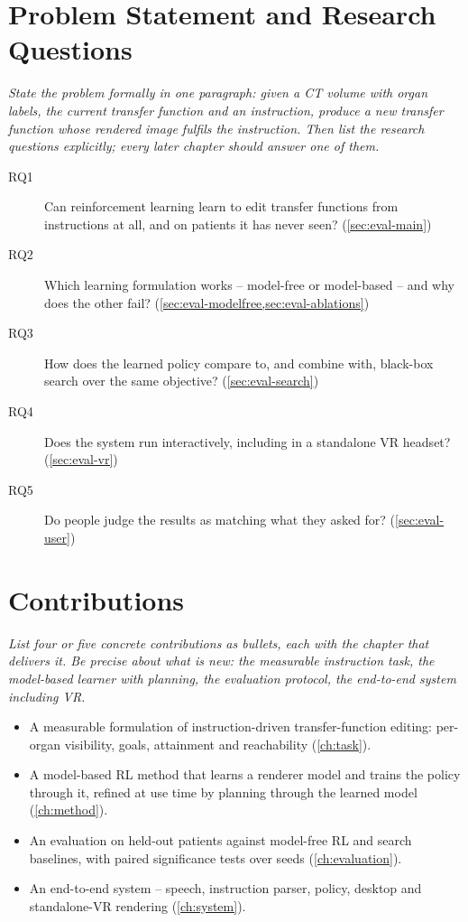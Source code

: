 \documentclass[12pt, a4paper]{book}
\newcommand{\plan}[1]{{\color{gray}\itshape #1\par}}
\begin{document}
\section{Problem Statement and Research Questions}
\label{sec:intro-questions}
\plan{State the problem formally in one paragraph: given a CT volume with organ labels, the current transfer function and an instruction, produce a new transfer function whose rendered image fulfils the instruction. Then list the research questions explicitly; every later chapter should answer one of them.}

\begin{description}
  \item[RQ1] Can reinforcement learning learn to edit transfer functions from instructions at all, and on patients it has never seen? \hfill (\cref{sec:eval-main})
  \item[RQ2] Which learning formulation works -- model-free or model-based -- and why does the other fail? \hfill (\cref{sec:eval-modelfree,sec:eval-ablations})
  \item[RQ3] How does the learned policy compare to, and combine with, black-box search over the same objective? \hfill (\cref{sec:eval-search})
  \item[RQ4] Does the system run interactively, including in a standalone VR headset? \hfill (\cref{sec:eval-vr})
  \item[RQ5] Do people judge the results as matching what they asked for? \hfill (\cref{sec:eval-user})
\end{description}

\section{Contributions}
\label{sec:intro-contributions}
\plan{List four or five concrete contributions as bullets, each with the chapter that delivers it. Be precise about what is new: the measurable instruction task, the model-based learner with planning, the evaluation protocol, the end-to-end system including VR.}

\begin{itemize}
  \item A measurable formulation of instruction-driven transfer-function editing: per-organ visibility, goals, attainment and reachability (\cref{ch:task}).
  \item A model-based RL method that learns a renderer model and trains the policy through it, refined at use time by planning through the learned model (\cref{ch:method}).
  \item An evaluation on held-out patients against model-free RL and search baselines, with paired significance tests over seeds (\cref{ch:evaluation}).
  \item An end-to-end system -- speech, instruction parser, policy, desktop and standalone-VR rendering (\cref{ch:system}).
\end{itemize}
\end{document}

